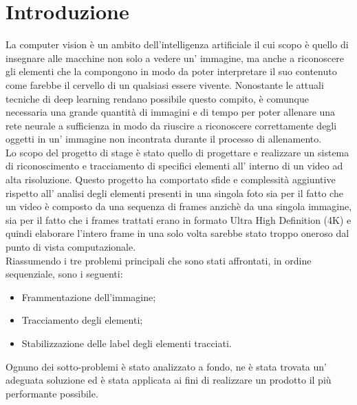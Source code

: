 \section{Introduzione}
La computer vision è un ambito dell'intelligenza artificiale il cui scopo è quello di insegnare alle macchine non solo a vedere un' immagine, ma anche a riconoscere gli elementi che la compongono in modo da poter interpretare il suo contenuto come farebbe il cervello di un qualsiasi essere vivente. Nonostante le attuali tecniche di deep learning rendano possibile questo compito, è comunque necessaria una grande quantità di immagini e di tempo per poter allenare una rete neurale a sufficienza in modo da riuscire a riconoscere correttamente degli oggetti in un' immagine non incontrata durante il processo di allenamento.\\

Lo scopo del progetto di stage è stato quello di progettare e realizzare un sistema di riconoscimento e tracciamento di specifici elementi all' interno di un video ad alta risoluzione. Questo progetto ha comportato sfide e complessità aggiuntive rispetto all' analisi degli elementi presenti in una singola foto sia per il fatto che un video è composto da una sequenza di frames anzichè da una singola immagine, sia per il fatto che i frames trattati erano in formato Ultra High Definition (4K) e quindi elaborare l'intero frame in una solo volta sarebbe stato troppo oneroso dal punto di vista computazionale.\\

Riassumendo i tre problemi principali che sono stati affrontati, in ordine sequenziale, sono i seguenti:
\begin{itemize}
\item Frammentazione dell'immagine;
\item Tracciamento degli elementi;
\item Stabilizzazione delle label degli elementi tracciati.
\end{itemize}
Ognuno dei sotto-problemi è stato analizzato a fondo, ne è stata trovata un' adeguata soluzione ed è stata applicata ai fini di realizzare un prodotto il più performante possibile.